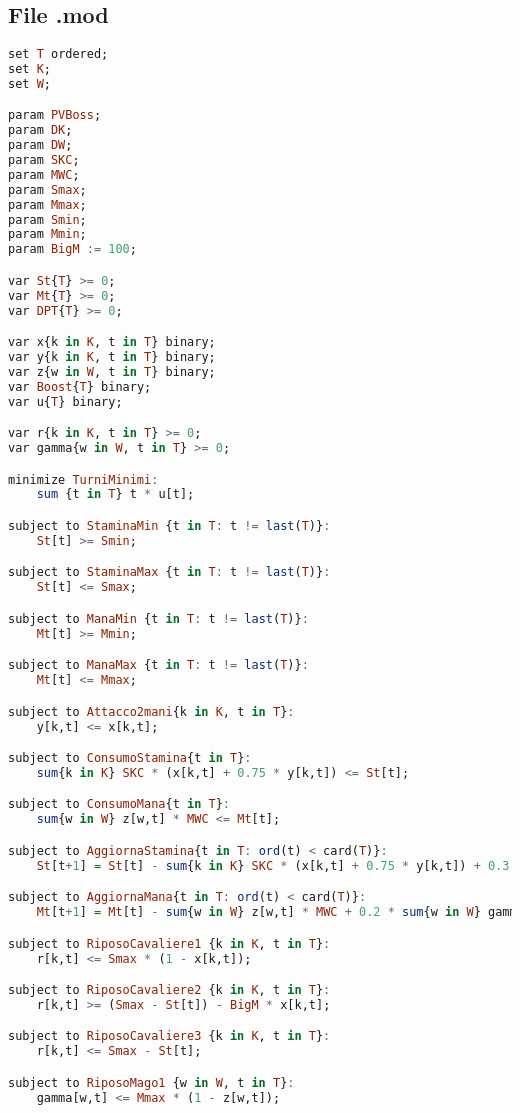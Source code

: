 \documentclass[12pt]{article}
\begin{document}
\subsection{File .mod}
\begin{lstlisting}[language=haskell, frame=single, caption={Modello in Ampl}, captionpos=b, keywordstyle=\color{purple}]  
set T ordered;
set K; 
set W;

param PVBoss;
param DK;
param DW;
param SKC;
param MWC;
param Smax;
param Mmax;
param Smin;
param Mmin;
param BigM := 100;

var St{T} >= 0;
var Mt{T} >= 0;
var DPT{T} >= 0;

var x{k in K, t in T} binary;  
var y{k in K, t in T} binary;  
var z{w in W, t in T} binary;  
var Boost{T} binary;
var u{T} binary;

var r{k in K, t in T} >= 0;    
var gamma{w in W, t in T} >= 0; 

minimize TurniMinimi:
    sum {t in T} t * u[t];

subject to StaminaMin {t in T: t != last(T)}: 
    St[t] >= Smin;

subject to StaminaMax {t in T: t != last(T)}: 
    St[t] <= Smax;

subject to ManaMin {t in T: t != last(T)}: 
    Mt[t] >= Mmin;

subject to ManaMax {t in T: t != last(T)}: 
    Mt[t] <= Mmax;

subject to Attacco2mani{k in K, t in T}:
    y[k,t] <= x[k,t];

subject to ConsumoStamina{t in T}:
    sum{k in K} SKC * (x[k,t] + 0.75 * y[k,t]) <= St[t];

subject to ConsumoMana{t in T}:
    sum{w in W} z[w,t] * MWC <= Mt[t];

subject to AggiornaStamina{t in T: ord(t) < card(T)}:
    St[t+1] = St[t] - sum{k in K} SKC * (x[k,t] + 0.75 * y[k,t]) + 0.3 * sum{k in K} r[k,t];

subject to AggiornaMana{t in T: ord(t) < card(T)}:
    Mt[t+1] = Mt[t] - sum{w in W} z[w,t] * MWC + 0.2 * sum{w in W} gamma[w,t];

subject to RiposoCavaliere1 {k in K, t in T}:
    r[k,t] <= Smax * (1 - x[k,t]);

subject to RiposoCavaliere2 {k in K, t in T}:
    r[k,t] >= (Smax - St[t]) - BigM * x[k,t];

subject to RiposoCavaliere3 {k in K, t in T}:
    r[k,t] <= Smax - St[t];

subject to RiposoMago1 {w in W, t in T}:
    gamma[w,t] <= Mmax * (1 - z[w,t]);


\end{lstlisting}
\end{document}
